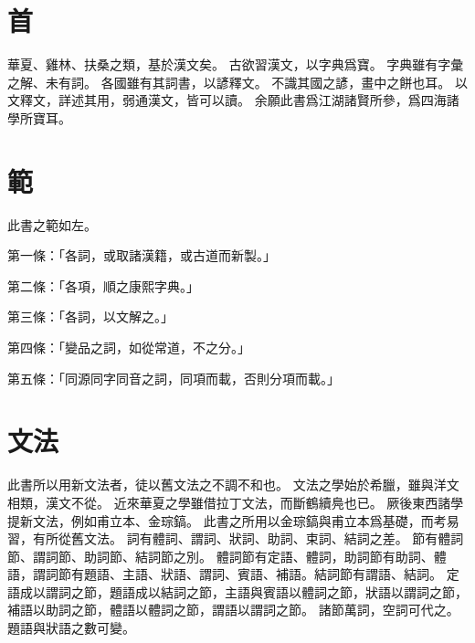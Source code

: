 \section{首}
華夏、雞林、扶桑之類，基於漢文矣。
古欲習漢文，以字典爲寶。
字典雖有字彙之解、未有詞。
各國雖有其詞書，以諺釋文。
不識其國之諺，畫中之餅也耳。
以文釋文，詳述其用，弱通漢文，皆可以讀。
余願此書爲江湖諸賢所參，爲四海諸學所寶耳。
\section{範}
此書之範如左。
\par 第一條：「各詞，或取諸漢籍，或古道而新製。」
\par 第二條：「各項，順之康熙字典。」
\par 第三條：「各詞，以文解之。」
\par 第四條：「變品之詞，如從常道，不之分。」
\par 第五條：「同源同字同音之詞，同項而載，否則分項而載。」
\section{文法}
此書所以用新文法者，徒以舊文法之不調不和也。
文法之學始於希臘，雖與洋文相類，漢文不從。
近來華夏之學雖借拉丁文法，而斷鶴續鳧也已。
厥後東西諸學提新文法，例如甫立本、金琮鎬。
此書之所用以金琮鎬與甫立本爲基礎，而考易習，有所從舊文法。
詞有體詞、謂詞、狀詞、助詞、束詞、結詞之差。
節有體詞節、謂詞節、助詞節、結詞節之別。
體詞節有定語、體詞，助詞節有助詞、體語，謂詞節有題語、主語、狀語、謂詞、賓語、補語。結詞節有謂語、結詞。
定語成以謂詞之節，題語成以結詞之節，主語與賓語以體詞之節，狀語以謂詞之節，補語以助詞之節，體語以體詞之節，謂語以謂詞之節。
諸節萬詞，空詞可代之。題語與狀語之數可變。
